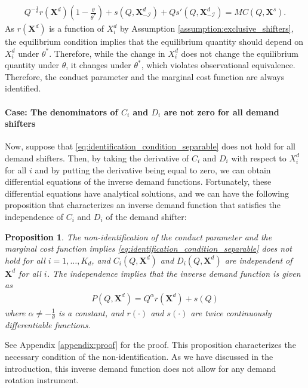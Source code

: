 \documentclass[11pt, a4paper]{article}
\newtheorem{proposition}{Proposition}
\begin{document}
\begin{align}
    Q^{-\frac{1}{\theta}}r(\bm{X}^{d})\left(1 - \frac{\theta}{\theta^{*}}\right) + s(Q, \bm{X}^{d}_{-\mathcal{I}}) +  Qs'(Q, \bm{X}^{d}_{-\mathcal{I}}) = MC(Q, \bm{X}^{s}).
\end{align}
As $r(\bm{X}^{d})$ is a function of $X^{d}_i$ by Assumption \ref{assumption:exclusive_shifters}, the equilibrium condition implies that the equilibrium quantity should depend on $X^{d}_i$ under $\theta^{*}$.
Therefore, while the change in $X^{d}_i$ does not change the equilibrium quantity under $\theta$, it changes under $\theta^{*}$, which violates observational equivalence.
Therefore, the conduct parameter and the marginal cost function are always identified.




\paragraph{Case: The denominators of $C_i$ and $D_i$ are not zero for all demand shifters}
Now, suppose that \eqref{eq:identification_condition_separable} does not hold for all demand shifters.
Then, by taking the derivative of $C_i$ and $D_i$ with respect to $X^{d}_i$ for all $i$ and by putting the derivative being equal to zero, we can obtain differential equations of the inverse demand functions.
Fortunately, these differential equations have analytical solutions, and we can have the following proposition that characterizes an inverse demand function that satisfies the independence of $C_i$ and $D_i$ of the demand shifter:
\begin{proposition}\label{proposition:nonidentification_inverse_demand}
    The non-identification of the conduct parameter and the marginal cost function implies \eqref{eq:identification_condition_separable} does not hold for all $i  = 1, \ldots, K_d$, and $C_i(Q, \bm{X}^{d})$ and $D_i(Q, \bm{X}^{d})$ are independent of $\bm{X}^{d}$ for all $i$.    
    The independence implies that the inverse demand function is given as
    \begin{align}
        P(Q, \bm{X}^{d}) = Q^{\alpha}r(\bm{X}^{d}) + s(Q)
    \end{align}
    where $\alpha \ne -\frac{1}{\theta}$ is a constant, and $r(\cdot)$ and $s(\cdot)$ are twice continuously differentiable functions.
\end{proposition}
See Appendix \ref{appendix:proof} for the proof.
This proposition characterizes the necessary condition of the non-identification.
As we have discussed in the introduction, this inverse demand function does not allow for any demand rotation instrument.
\end{document}
